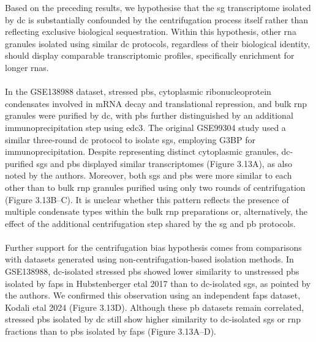 Based on the preceding results, we hypothesise that the \gls{sg} transcriptome isolated by \gls{dc} is substantially confounded by the centrifugation process itself rather than reflecting exclusive biological sequestration. Within this hypothesis, other \gls{rna} granules isolated using similar \gls{dc} protocols, regardless of their biological identity, should display comparable transcriptomic profiles, specifically enrichment for longer \glspl{rna}.
\\
\\
In the GSE138988\cite{matheny_transcriptome-wide_2019} dataset, stressed \glspl{pb}, cytoplasmic ribonucleoprotein condensates involved in mRNA decay and translational repression\cite{matheny_transcriptome-wide_2019}, and bulk \gls{rnp} granules were purified by \gls{dc}, with \glspl{pb} further distinguished by an additional immunoprecipitation step using \gls{edc3}. The original GSE99304\cite{khong_stress_2017} study used a similar three-round \gls{dc} protocol to isolate \glspl{sg}, employing G3BP for immunoprecipitation. Despite representing distinct cytoplasmic granules, \gls{dc}-purified \glspl{sg} and \glspl{pb} displayed similar transcriptomes (Figure 3.13A), as also noted by the authors\cite{matheny_transcriptome-wide_2019}. Moreover, both \glspl{sg} and \glspl{pb} were more similar to each other than to bulk \gls{rnp} granules purified using only two rounds of centrifugation (Figure 3.13B–C). It is unclear whether this pattern reflects the presence of multiple condensate types within the bulk \gls{rnp} preparations or, alternatively, the effect of the additional centrifugation step shared by the \gls{sg} and \gls{pb} protocols.
\\
\\
Further support for the centrifugation bias hypothesis comes from comparisons with datasets generated using non-centrifugation-based isolation methods. In GSE138988\cite{matheny_transcriptome-wide_2019}, \gls{dc}-isolated stressed \glspl{pb} showed lower similarity to unstressed \glspl{pb} isolated by \gls{faps} in Hubstenberger \gls{etal} 2017\cite{hubstenberger_p-body_2017} than to \gls{dc}-isolated \glspl{sg}, as pointed by the authors\cite{matheny_transcriptome-wide_2019}. We confirmed this observation using an independent \gls{faps} dataset, Kodali \gls{etal} 2024\cite{kodali_rna_2024} (Figure 3.13D). Although these \gls{pb} datasets remain correlated, stressed \glspl{pb} isolated by \gls{dc} still show higher similarity to \gls{dc}-isolated \glspl{sg} or \gls{rnp} fractions than to \glspl{pb} isolated by \gls{faps} (Figure 3.13A–D).
